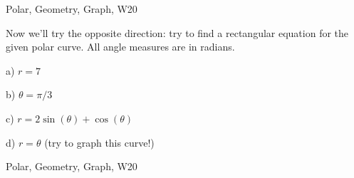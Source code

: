 \begin{tagblock}{Polar, Geometry, Graph, W20}
\begin{question}

Now we'll try the opposite direction: try to find a rectangular equation for the given polar curve. All angle measures are in radians. 

\bigskip

a) $r=7$

\bigskip

b) $\theta=\pi/3$

\bigskip

c) $r=2\sin(\theta)+\cos(\theta)$

\bigskip

d) $r=\theta$ (try to graph this curve!)
	
	
\begin{tags}
	    Polar, Geometry, Graph, W20
\end{tags}
	
\begin{diary}
\end{diary}
	
\begin{solution}
	   
\end{solution}
	
\end{question}

\end{tagblock}

